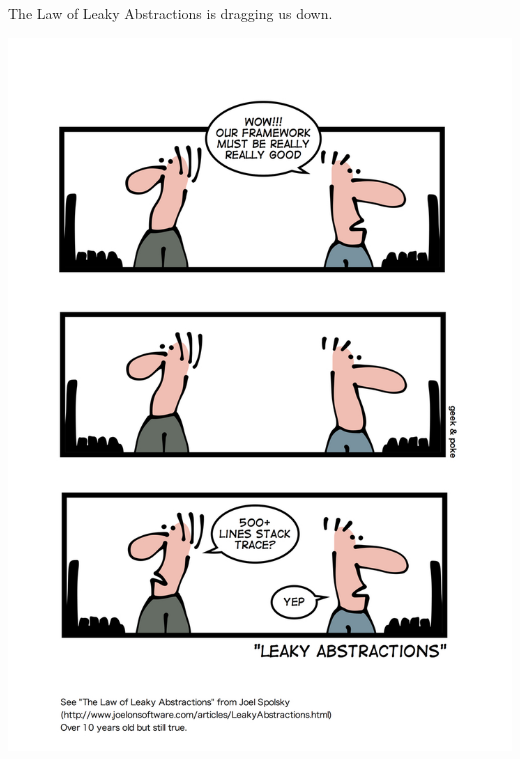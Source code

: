 \documentclass{article}
\begin{document}
The Law of Leaky Abstractions is dragging us down.

\centering
\includegraphics{good-framework.jpg}

{}

\end{document}
